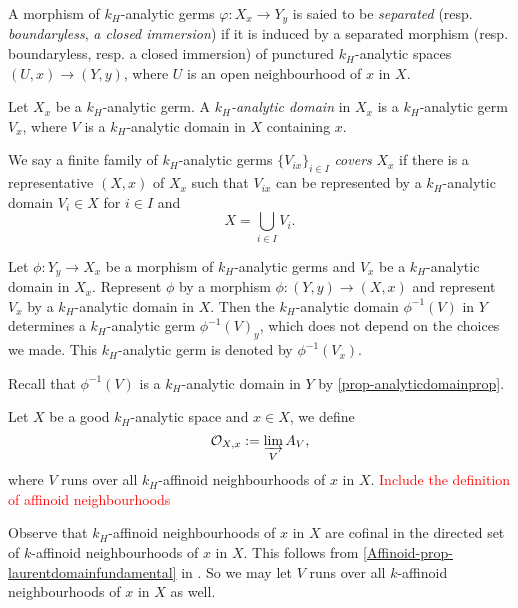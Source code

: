 \begin{definition}
    A morphism of $k_H$-analytic germs $\varphi:X_x\rightarrow Y_y$ is saied to be \emph{separated} (resp. \emph{boundaryless}, \emph{a closed immersion}) if it is induced by a separated morphism (resp. boundaryless, resp. a closed immersion) of punctured $k_H$-analytic spaces $(U,x)\rightarrow (Y,y)$, where $U$ is an open neighbourhood of $x$ in $X$.
\end{definition}

\begin{definition}
    Let $X_x$ be a $k_H$-analytic germ. A \emph{$k_H$-analytic domain} in $X_x$ is a $k_H$-analytic germ $V_x$, where $V$ is a $k_H$-analytic domain in $X$ containing $x$.
    
    We say a finite family of $k_H$-analytic germs $\{V_{ix}\}_{i\in I}$ \emph{covers} $X_x$ if there is a representative $(X,x)$ of $X_x$ such that $V_{ix}$ can be represented by a $k_H$-analytic domain $V_i\in X$ for $i\in I$ and  
    \[
        X=\bigcup_{i\in I}V_{i}.  
    \]
\end{definition}

\begin{definition}
    Let $\phi:Y_y\rightarrow X_x$ be a morphism of $k_H$-analytic germs and $V_x$ be a $k_H$-analytic domain in $X_x$. Represent $\phi$ by a morphism $\phi:(Y,y)\rightarrow (X,x)$ and represent $V_x$ by a $k_H$-analytic domain in $X$. Then the $k_H$-analytic domain $\phi^{-1}(V)$ in $Y$ determines a $k_H$-analytic germ $\phi^{-1}(V)_y$, which does not depend on the choices we made. This $k_H$-analytic germ is denoted by $\phi^{-1}(V_x)$.
\end{definition}
Recall that $\phi^{-1}(V)$ is a $k_H$-analytic domain in $Y$ by \cref{prop-analyticdomainprop}.


\begin{definition}
    Let $X$ be a good $k_H$-analytic space and $x\in X$, we define
    \[
        \mathcal{O}_{X,x}:=\varinjlim_{V} A_V,  
    \]
    where $V$ runs over all $k_H$-affinoid neighbourhoods of $x$ in $X$. \textcolor{red}{Include the definition of affinoid neighbourhoods}
\end{definition}
Observe that $k_H$-affinoid neighbourhoods of $x$ in $X$ are cofinal in the directed set of $k$-affinoid neighbourhoods of $x$ in $X$. This follows from \cref{Affinoid-prop-laurentdomainfundamental} in . So we may let $V$ runs over all $k$-affinoid neighbourhoods of $x$ in $X$ as well.

